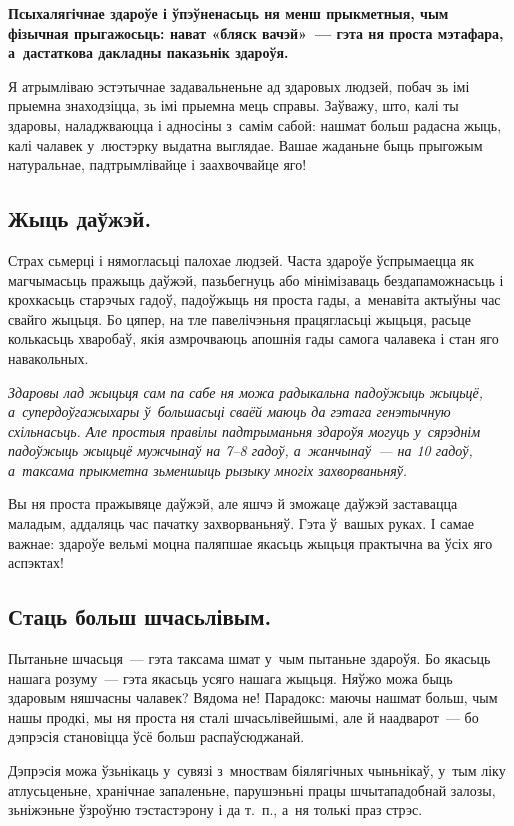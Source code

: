 \textbf{Псыхалягічнае здароўе і ўпэўненасьць ня менш прыкметныя, чым фізычная прыгажосьць: нават «бляск вачэй»~--- гэта ня проста мэтафара, а~дастаткова дакладны паказьнік здароўя.}

Я атрымліваю эстэтычнае задавальненьне ад здаровых людзей, побач зь імі прыемна знаходзіцца, зь імі прыемна мець справы. Заўважу, што, калі ты здаровы, наладжваюцца і адносіны з~самім сабой: нашмат больш радасна жыць, калі чалавек у~люстэрку выдатна выглядае. Вашае жаданьне быць прыгожым натуральнае, падтрымлівайце і заахвочвайце яго!

\subsection*{Жыць даўжэй.}

Страх сьмерці і нямогласьці палохае людзей. Часта здароўе ўспрымаецца як магчымасьць пражыць даўжэй, пазьбегнуць або мінімізаваць бездапаможнасьць і крохкасьць старэчых гадоў, падоўжыць ня проста гады, а~менавіта актыўны час свайго жыцьця. Бо цяпер, на тле павелічэньня працягласьці жыцьця, расьце колькасьць хваробаў, якія азмрочваюць апошнія гады самога чалавека і стан яго навакольных.

\emph{Здаровы лад жыцьця сам па сабе ня можа радыкальна падоўжыць жыцьцё, а~супердоўгажыхары ў~большасьці сваёй маюць да гэтага генэтычную схільнасьць. Але простыя правілы падтрыманьня здароўя могуць у~сярэднім падоўжыць жыцьцё мужчынаў на 7--8 гадоў, а~жанчынаў~--- на 10 гадоў, а~таксама прыкметна зьменшыць рызыку многіх захворваньняў.}

Вы ня проста пражывяце даўжэй, але яшчэ й зможаце даўжэй заставацца маладым, аддаляць час пачатку захворваньняў. Гэта ў~вашых руках. І самае важнае: здароўе вельмі моцна паляпшае якасьць жыцьця практычна ва ўсіх яго аспэктах!

\subsection*{Стаць больш шчасьлівым.}

Пытаньне шчасьця~--- гэта таксама шмат у~чым пытаньне здароўя. Бо якасьць нашага розуму~--- гэта якасьць усяго нашага жыцьця. Няўжо можа быць здаровым няшчасны чалавек? Вядома не! Парадокс: маючы нашмат больш, чым нашы продкі, мы ня проста ня сталі шчасьлівейшымі, але й наадварот~--- бо дэпрэсія становіцца ўсё больш распаўсюджанай.

Дэпрэсія можа ўзьнікаць у~сувязі з~мноствам біялягічных чыньнікаў, у~тым ліку атлусьценьне, хранічнае запаленьне, парушэньні працы шчытападобнай залозы, зьніжэньне ўзроўню тэстастэрону і да т.~п., а~ня толькі праз стрэс.

